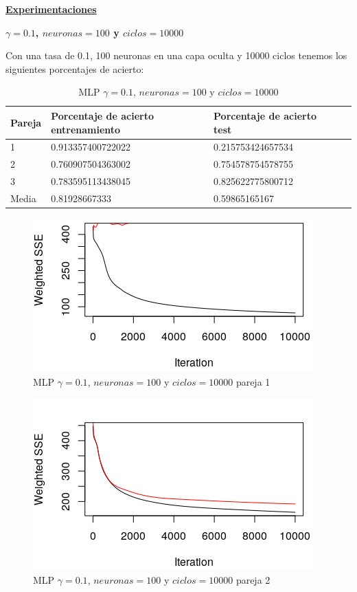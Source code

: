 \documentclass[11pt,spanish,listoffigures,listoftables]{workluis}
\begin{document}
\par \underline{\textbf{Experimentaciones}}


\par \textbf{$\gamma = 0.1$, $neuronas = 100$ y $ciclos = 10000$}

\par Con una tasa de 0.1, 100 neuronas en una capa oculta y 10000 ciclos tenemos los siguientes porcentajes de acierto:

\begin{table}[H]
\centering
\caption{MLP $\gamma = 0.1$, $neuronas = 100$ y $ciclos = 10000$}
\label{tb:tb1}
\begin{tabular}{lllll}
\hline
\multicolumn{1}{|l|}{Pareja} & Porcentaje de acierto entrenamiento & Porcentaje de acierto test  \\ \hline \hline
1                            & 0.913357400722022    & 0.215753424657534 \\
2                            & 0.760907504363002    & 0.754578754578755 \\
3                            & 0.783595113438045    & 0.825622775800712 \\
Media                        & 0.81928667333        & 0.59865165167     \\ \hline
\end{tabular}
\end{table}

\begin{figure}[H]
\centering
\includegraphics[scale=5]{011001}
\caption{MLP $\gamma = 0.1$, $neuronas = 100$ y $ciclos = 10000$ pareja 1}
\end{figure} 

\begin{figure}[H]
\centering
\includegraphics[scale=5]{011002}
\caption{MLP $\gamma = 0.1$, $neuronas = 100$ y $ciclos = 10000$ pareja 2}
\end{figure} 
\end{document}
